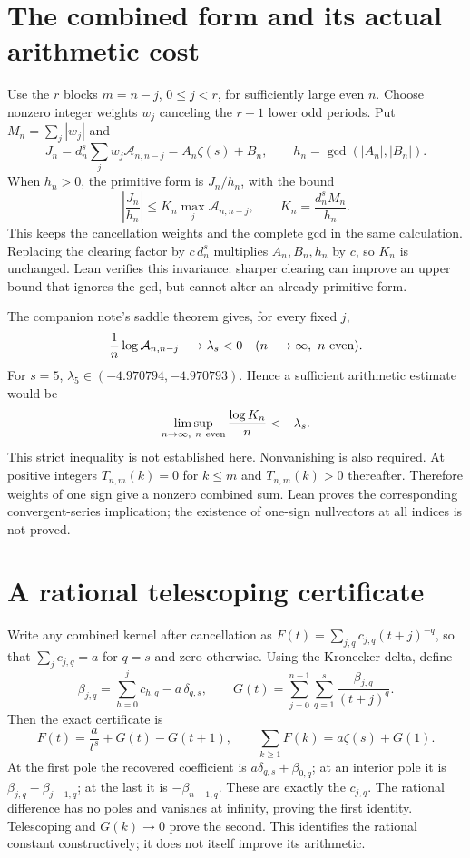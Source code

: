 \documentclass[11pt]{article}
\begin{document}
\section{The combined form and its actual arithmetic cost}
Use the $r$ blocks $m=n-j$, $0\le j<r$, for sufficiently large even $n$.
Choose nonzero integer weights $w_j$ canceling the $r-1$ lower odd periods.
Put $M_n=\sum_j|w_j|$ and
\[
 J_n=d_n^s\sum_jw_j\mathcal A_{n,n-j}=A_n\zeta(s)+B_n,\qquad
 h_n=\gcd(|A_n|,|B_n|).
\]
When $h_n>0$, the primitive form is $J_n/h_n$, with the bound
\begin{equation}
 \left|\frac{J_n}{h_n}\right|
 \le K_n\max_j\mathcal A_{n,n-j},
 \qquad K_n=\frac{d_n^s M_n}{h_n}.
 \label{eq:cost}
\end{equation}
This keeps the cancellation weights and the complete gcd in the same
calculation. Replacing the clearing factor by $c\,d_n^s$ multiplies
$A_n,B_n,h_n$ by $c$, so $K_n$ is unchanged. Lean verifies this invariance:
sharper clearing can improve an upper bound that ignores the gcd, but
cannot alter an already primitive form.

The companion note's saddle theorem \cite[Section 5]{Companion} gives,
for every fixed $j$,
\[
 \frac1n\log\mathcal A_{n,n-j}\longrightarrow\lambda_s<0
 \quad(n\longrightarrow\infty,\ n\ {\rm even}).
\]
For $s=5$, $\lambda_5\in(-4.970794,-4.970793)$. Hence a sufficient
arithmetic estimate would be
\[
 \limsup_{n\to\infty,\ n\ {\rm even}}\frac{\log K_n}{n}<-\lambda_s.
\]
This strict inequality is not established here. Nonvanishing is also
required. At positive integers $T_{n,m}(k)=0$ for $k\le m$ and
$T_{n,m}(k)>0$ thereafter. Therefore weights of one sign give a nonzero
combined sum. Lean proves the corresponding convergent-series implication;
the existence of one-sign nullvectors at all indices is not proved.

\section{A rational telescoping certificate}
Write any combined kernel after cancellation as
$F(t)=\sum_{j,q}c_{j,q}(t+j)^{-q}$, so that
$\sum_jc_{j,q}=a$ for $q=s$ and zero otherwise. Using the Kronecker delta, define
\[
 \beta_{j,q}=\sum_{h=0}^j c_{h,q}-a\,\delta_{q,s},\qquad
 G(t)=\sum_{j=0}^{n-1}\sum_{q=1}^s\frac{\beta_{j,q}}{(t+j)^q}.
\]
Then the exact certificate is
\begin{equation}
 F(t)=\frac a{t^s}+G(t)-G(t+1),\qquad
 \sum_{k\ge1}F(k)=a\zeta(s)+G(1).
 \label{eq:telescoper}
\end{equation}
At the first pole the recovered coefficient is
$a\delta_{q,s}+\beta_{0,q}$; at an interior pole it is
$\beta_{j,q}-\beta_{j-1,q}$; at the last it is $-\beta_{n-1,q}$.
These are exactly the $c_{j,q}$. The rational difference has no poles
and vanishes at infinity, proving the first identity. Telescoping and
$G(k)\to0$ prove the second. This identifies the rational constant
constructively; it does not itself improve its arithmetic.
\end{document}
